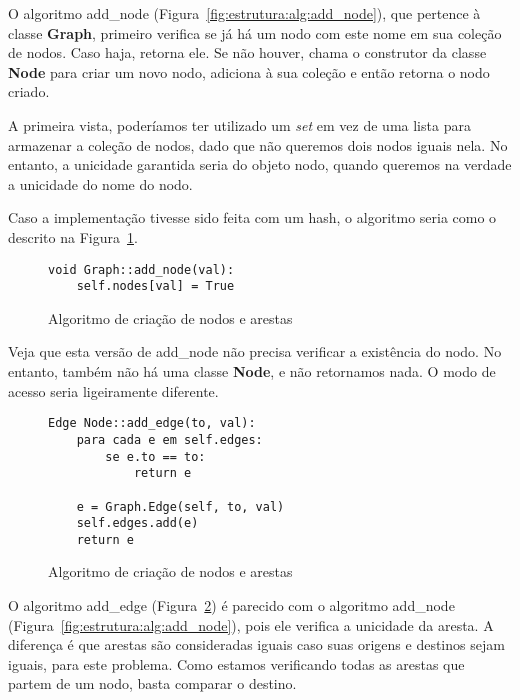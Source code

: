 \documentclass[12pt]{article}
\begin{document}
O algoritmo \textsf{add\_node} (Figura~\ref{fig:estrutura:alg:add_node}),
que pertence à classe \textsf{\textbf{Graph}}, primeiro verifica se já há um
nodo com este nome em sua coleção de nodos. Caso haja, retorna ele. Se não
houver, chama o construtor da classe \textsf{\textbf{Node}} para criar um novo
nodo, adiciona à sua coleção e então retorna o nodo criado.

A primeira vista, poderíamos ter utilizado um \textit{set} em vez de uma lista
para armazenar a coleção de nodos, dado que não queremos dois nodos iguais nela.
No entanto, a unicidade garantida seria do objeto nodo, quando queremos na
verdade a unicidade do nome do nodo.

Caso a implementação tivesse sido feita com um hash, o algoritmo seria como o
descrito na Figura~\ref{fig:estrutura:alg:add_node_hash}.

\begin{figure}[htb!]
  \centering
\begin{lstlisting}
void Graph::add_node(val):
    self.nodes[val] = True
\end{lstlisting}
  \caption{Algoritmo de criação de nodos e arestas}
\label{fig:estrutura:alg:add_node_hash}
\end{figure}

Veja que esta versão de \textsf{add\_node} não precisa verificar a existência do
nodo. No entanto, também não há uma classe \textsf{\textbf{Node}}, e não
retornamos nada. O modo de acesso seria ligeiramente diferente.

\begin{figure}[htb!]
  \centering
\begin{lstlisting}
Edge Node::add_edge(to, val):
    para cada e em self.edges:
        se e.to == to:
            return e

    e = Graph.Edge(self, to, val)
    self.edges.add(e)
    return e
\end{lstlisting}
  \caption{Algoritmo de criação de nodos e arestas}
\label{fig:estrutura:alg:add_edge}
\end{figure}

O algoritmo \textsf{add\_edge} (Figura~\ref{fig:estrutura:alg:add_edge}) é
parecido com o algoritmo \textsf{add\_node}
(Figura~\ref{fig:estrutura:alg:add_node}), pois ele verifica a unicidade da
aresta. A diferença é que arestas são consideradas iguais caso suas origens e
destinos sejam iguais, para este problema. Como estamos verificando todas as
arestas que partem de um nodo, basta comparar o destino.
\end{document}

